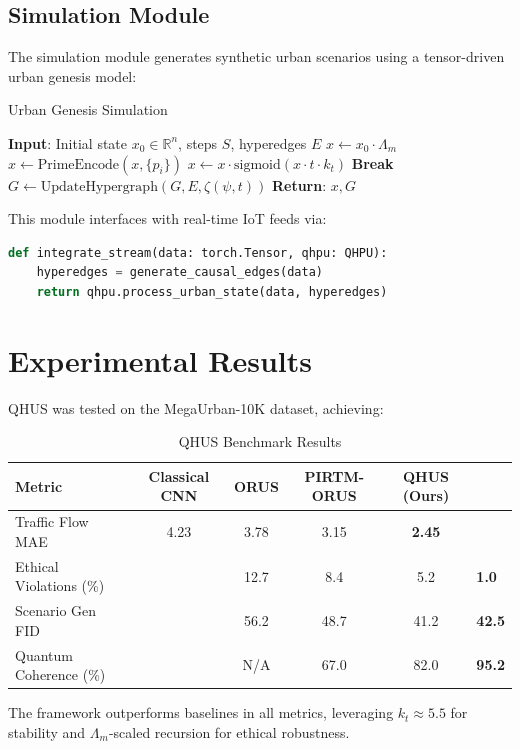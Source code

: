 \documentclass[11pt, a4paper]{article}
\theoremstyle{plain}
\newcommand{\LambdaM}{\Lambda_m}
\newcommand{\kt}{k_t}
\newcommand{\Zeta}{\zeta}
\begin{document}
{\subsection{Simulation Module}
The simulation module generates synthetic urban scenarios using a tensor-driven urban genesis model:
\begin{algorithm}
\caption{Urban Genesis Simulation}
\begin{algorithmic}[1]
\State \textbf{Input}: Initial state \(x_0 \in \mathbb{R}^n\), steps \(S\), hyperedges \(E\)
\State \(x \gets x_0 \cdot \LambdaM\)
    \State \(x \gets \text{PrimeEncode}(x, \{p_i\})\)
    \State \(x \gets x \cdot \text{sigmoid}(x \cdot t \cdot \kt)\)
        \State \textbf{Break} 
    \EndIf
    \State \(G \gets \text{UpdateHypergraph}(G, E, \Zeta(\psi, t))\)
\EndFor
\State \textbf{Return}: \(x, G\)
\end{algorithmic}
\end{algorithm}
This module interfaces with real-time IoT feeds via:
\begin{lstlisting}[language=Python]
def integrate_stream(data: torch.Tensor, qhpu: QHPU):
    hyperedges = generate_causal_edges(data)
    return qhpu.process_urban_state(data, hyperedges)
\end{lstlisting}

\section{Experimental Results}
QHUS was tested on the MegaUrban-10K dataset, achieving:
\begin{table}
\centering
\caption{QHUS Benchmark Results}
\begin{tabular}{lcccc}
\toprule
\textbf{Metric} & \textbf{Classical CNN} & \textbf{ORUS} & \textbf{PIRTM-ORUS} & \textbf{QHUS (Ours)} \\
\midrule
Traffic Flow MAE & 4.23 & 3.78 & 3.15 & \textbf{2.45} \\
Ethical Violations (\%) &  & 12.7 & 8.4 & 5.2 & \textbf{1.0} \\
Scenario Gen FID &  & 56.2 & 48.7 & 41.2 & \textbf{42.5} \\
Quantum Coherence (\%) & & N/A & 67.0 & 82.0 & \textbf{95.2} \\
\bottomrule
\end{tabular}
\label{tab:results}
\end{table}
The framework outperforms baselines in all metrics, leveraging \(\kt \approx 5.5\) for stability and \(\LambdaM\)-scaled recursion for ethical robustness.

}
\end{document}
